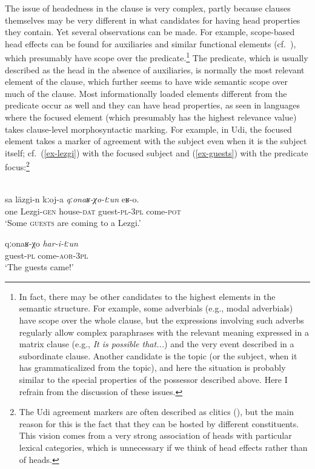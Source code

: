 \documentclass[output=paper
  ,nobabel
  ,draftmode
  ,colorlinks, citecolor=brown
]{langscibook}
\begin{document}
The issue of headedness in the clause is very complex, partly because clauses themselves may be very
different in what candidates for having head properties they contain. Yet several observations can
be made. For example, scope-based head effects can be found for auxiliaries and similar functional
elements (cf.\ \cite{Zwicky85a}), which presumably have scope over the predicate.\footnote{In fact,
  there may be other candidates to the highest elements in the semantic structure. For example, some
  adverbials (e.g., modal adverbials) have scope over the whole clause, but the expressions
  involving such adverbs regularly allow complex paraphrases with the relevant meaning expressed in
  a matrix clause (e.g., \emph{It is possible that...}) and the very event described in a
  subordinate clause. Another candidate is the topic (or the subject, when it has grammaticalized
  from the topic), and here the situation is probably similar to the special properties of the
  possessor described above. Here I refrain from the discussion of these issues.} The predicate,
which is usually described as the head in the absence of auxiliaries, is normally the most relevant
element of the clause, which further seems to have wide semantic scope over much of the clause. Most
informationally loaded elements different from the predicate occur as well and they can have head
properties, as seen in languages where the focused element (which presumably has the highest
relevance value) takes clause-level morphosyntactic marking. For example, in Udi, the focused
element takes a marker of agreement with the subject even when it is the subject itself;
cf.\ (\ref{ex-lezgi}) with the focused subject and (\ref{ex-guests}) with the predicate
focus:\footnote{The Udi agreement markers are often described as clitics (\cite{Harris2002}), but
  the main reason for this is the fact that they can be hosted by different constituents. This
  vision comes from a very strong association of heads with particular lexical categories, which is
  unnecessary if we think of head effects rather than of heads.} 

\newpage
\ea
{}\\
\ea\label{ex-lezgi}
\gll sa	läzgi-n	kːoj-a  \emph{qːonaʁ-χo-tːun} eʁ-o.  \\ 
     one Lezgi-\textsc{gen}  house-\textsc{dat} guest-\textsc{pl-3pl}	come-\textsc{pot} \\
\glt `Some \textsc{guests} are coming to a Lezgi.'

\ex\label{ex-guests}
\gll qːonaʁ-χo	\emph{har-i-tːun}\\ guest-\textsc{pl} come-\textsc{aor-3pl} \\
\glt `The guests came!'
\z\z
\end{document}
